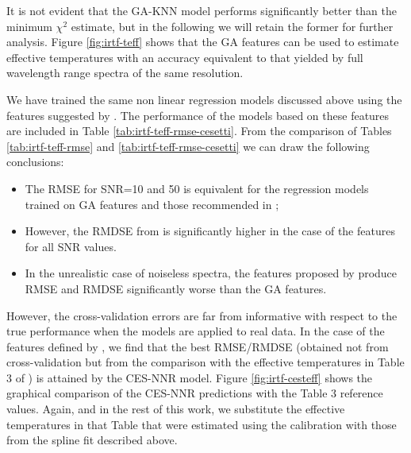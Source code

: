 It is not evident that the GA-KNN model performs significantly better
than the minimum $\chi^2$ estimate, but in the following we will
retain the former for further analysis. Figure \ref{fig:irtf-teff}
shows that the GA features can be used to estimate effective
temperatures with an accuracy equivalent to that yielded by full
wavelength range spectra of the same resolution.


We have trained the same non linear regression models discussed above
using the features suggested by \cite{cesetti}. The performance of the
models based on these features are included in Table 
\ref{tab:irtf-teff-rmse-cesetti}. From the comparison of Tables
\ref{tab:irtf-teff-rmse} and
\ref{tab:irtf-teff-rmse-cesetti} we can draw the following conclusions:

\begin{itemize}

\item The RMSE for SNR=10 and 50 is equivalent for the regression
  models trained on GA features and those recommended
  in \cite{cesetti};

\item However, the RMDSE from \cite{cesetti} is significantly higher
  in the case of the features for all SNR values.

\item In the unrealistic case of noiseless spectra, the features proposed
  by \cite{cesetti} produce RMSE and RMDSE significantly worse than
  the GA features.

\end{itemize}

However, the cross-validation errors are far from informative with
respect to the true performance when the models are applied to real
data. In the case of the features defined by \cite{cesetti}, we find
that the best RMSE/RMDSE (obtained not from cross-validation but from
the comparison with the effective temperatures in Table 3
of \cite{cesetti}) is attained by the CES-NNR
model. Figure \ref{fig:irtf-cesteff} shows the graphical comparison of
the CES-NNR predictions with the Table 3 reference values. Again, and
in the rest of this work, we substitute the effective temperatures in
that Table that were estimated using the \cite{1996imsa.book.....O}
calibration with those from the spline fit described above.

